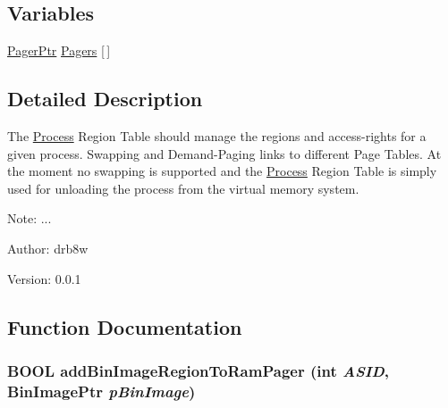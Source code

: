 \subsection*{Variables}
\begin{CompactItemize}
\item 
\hyperlink{struct_pager}{PagerPtr} \hyperlink{group___v_m_m___p_r_t_gd51c26b7297e20a13f290d1a9063efa5}{Pagers} \mbox{[}$\,$\mbox{]}
\end{CompactItemize}


\subsection{Detailed Description}
The \hyperlink{struct_process}{Process} Region Table should manage the regions and access-rights for a given process. Swapping and Demand-Paging links to different Page Tables. At the moment no swapping is supported and the \hyperlink{struct_process}{Process} Region Table is simply used for unloading the process from the virtual memory system. 

\begin{Desc}
\item[Note:]... \end{Desc}
\begin{Desc}
\item[Author:]drb8w \end{Desc}
\begin{Desc}
\item[Version:]0.0.1 \end{Desc}


\subsection{Function Documentation}
\hypertarget{group___v_m_m___p_r_t_g9a1a7531051937bcea7f8f373cd5e622}{
\subsubsection[{addBinImageRegionToRamPager}]{\setlength{\rightskip}{0pt plus 5cm}BOOL addBinImageRegionToRamPager (int {\em ASID}, \/  BinImagePtr {\em pBinImage})}}
\label{group___v_m_m___p_r_t_g9a1a7531051937bcea7f8f373cd5e622}


